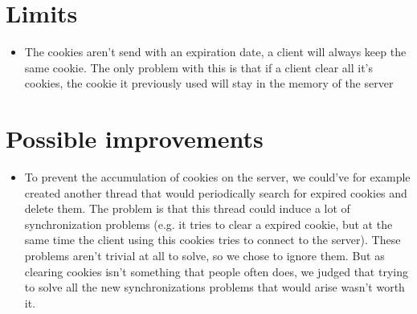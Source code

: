 \documentclass[11pt]{article}
\begin{document}
\section{Limits}
\begin{itemize}
\item The cookies aren't send with an expiration date, a client will always keep the same cookie. The only problem with this is that if a client clear all it's cookies, the cookie it previously used will stay in the memory of the server
\end{itemize}


\section{Possible improvements}
\begin{itemize}
\item 
To prevent the accumulation of cookies on the server, we could've for example created another thread that would periodically search for expired cookies and delete them. The problem is that this thread could induce a lot of synchronization problems (e.g. it tries to clear a expired cookie, but at the same time the client using this cookies tries to connect to the server). These problems aren't trivial at all to solve, so we chose to ignore them. But as  clearing cookies isn't something that people often does, we judged that trying to solve all the new synchronizations problems that would arise wasn't worth it. \\ 
\end{itemize}
\end{document}
